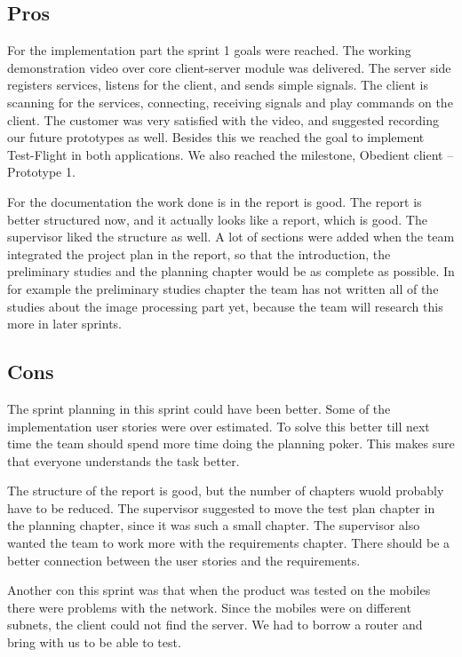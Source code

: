 \subsection{Pros}
For the implementation part the sprint 1 goals were reached. The working demonstration video over core client-server module was delivered. The server side registers services, listens for the client, and sends simple  signals. The client is scanning for the services, connecting, receiving signals and play commands on the client. The customer was very satisfied with the video, and suggested recording our future prototypes as well. Besides this we reached the goal to implement Test-Flight in both applications. We also reached the milestone, Obedient client -- Prototype 1.

For the documentation the work done is in the report is good. The report is better structured now, and it actually looks like a report, which is good. The supervisor liked the structure as well. A lot of sections were added when the team integrated the project plan in the report, so that the introduction, the preliminary studies and the planning chapter would be as complete as possible. In for example the preliminary studies chapter the team has not written all of the studies about the image processing part yet, because the team will research this more in later sprints.

\subsection{Cons}
The sprint planning in this sprint could have been better. Some of the implementation user stories were over estimated. To solve this better till next time the team should spend more time doing the planning poker. This makes sure that everyone understands the task better. 

The structure of the report is good, but the number of chapters wuold probably have to be reduced. The supervisor suggested to move the test plan chapter in the planning chapter, since it was such a small chapter. The supervisor also wanted the team to work more with the requirements chapter. There should be a better connection between the user stories and the requirements.


Another con this sprint was that when the product was tested on the mobiles there were problems with the network. Since the mobiles were on different subnets, the client could not find the server. We had to borrow a router and bring with us to be able to test. 